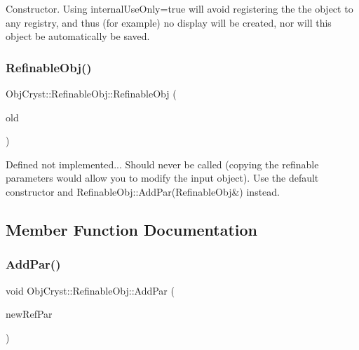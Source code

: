 Constructor. Using internal\+Use\+Only=true will avoid registering the the object to any registry, and thus (for example) no display will be created, nor will this object be automatically be saved. \mbox{\label{class_obj_cryst_1_1_refinable_obj_a5f77dcf037cc8d2ea1fd84bfda6ddbc0}} 
\subsubsection{\texorpdfstring{RefinableObj()}{RefinableObj()}\hspace{0.1cm}{\footnotesize\ttfamily [2/2]}}
{\footnotesize\ttfamily Obj\+Cryst\+::\+Refinable\+Obj\+::\+Refinable\+Obj (\begin{DoxyParamCaption}\item[{const \mbox{\hyperlink{class_obj_cryst_1_1_refinable_obj}{Refinable\+Obj}} \&}]{old }\end{DoxyParamCaption})}

Defined not implemented... Should never be called (copying the refinable parameters would allow you to modify the input object). Use the default constructor and Refinable\+Obj\+::\+Add\+Par(\+Refinable\+Obj\&) instead. 

\subsection{Member Function Documentation}
\mbox{\label{class_obj_cryst_1_1_refinable_obj_a0c0050a3d3141ca34eb8f4b559ad2f8d}} 
\subsubsection{\texorpdfstring{AddPar()}{AddPar()}\hspace{0.1cm}{\footnotesize\ttfamily [1/3]}}
{\footnotesize\ttfamily void Obj\+Cryst\+::\+Refinable\+Obj\+::\+Add\+Par (\begin{DoxyParamCaption}\item[{const \mbox{\hyperlink{class_obj_cryst_1_1_refinable_par}{Refinable\+Par}} \&}]{new\+Ref\+Par }\end{DoxyParamCaption})}

